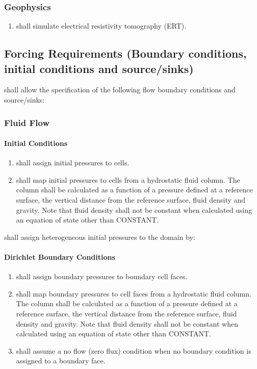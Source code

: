 \subsubsection{Geophysics}
\begin{enumerate}[resume]
	\item \label{PCERT} \pft shall simulate electrical resistivity tomography (ERT). 
\end{enumerate}

\subsection{Forcing Requirements (Boundary conditions, initial conditions and source/sinks)}
\pft shall allow the specification of the following flow boundary conditions and source/sinks:

\subsubsection{Fluid Flow}
\newcommand{\hydrostatictext}{	The column shall be calculated as a function of a pressure defined at a reference surface, the vertical distance from the reference surface, fluid density and gravity. Note that fluid density shall not be constant when calculated using an equation of state other than CONSTANT.}
\paragraph{Initial Conditions}
\begin{enumerate}
	\item \label{fluidDirichletIC} \pft shall assign initial pressures to cells. 
	\item \label{fluidHydrostaticIC} \pft shall map initial pressures to cells from a hydrostatic fluid column.
	\hydrostatictext
\end{enumerate}

\vspace{0.25cm}
\noindent\pft shall assign heterogeneous initial pressures to the domain by:
\begin{enumerate}[resume]
	\assignbyregion\label{fluidICRegion}
	\assignbycoordinate\label{fluidICLocation}
	\assignbycellid\label{fluidICCellID}
\end{enumerate}

\paragraph{Dirichlet Boundary Conditions}
\begin{enumerate}[resume]
	\item \label{fluidDirichletBC} \pft shall assign boundary pressures to boundary cell faces. 
	\item \label{fluidHydrostaticBC} \pft shall map boundary pressures to cell faces from a hydrostatic fluid column.
	\hydrostatictext
	\item \label{FRnoFlow} \pft shall assume a no flow (zero flux) condition when no boundary condition is assigned to a boundary face.
\end{enumerate}

